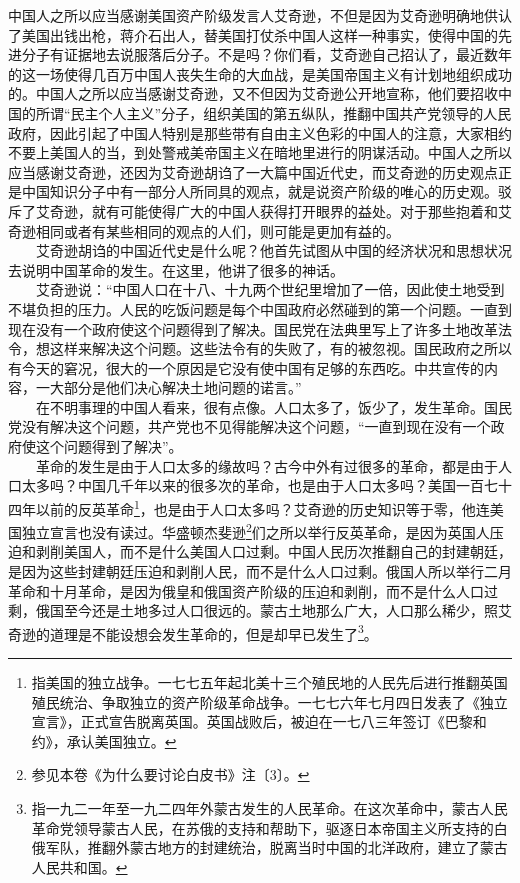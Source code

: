 \documentclass[cn,11pt,chinese]{elegantbook}
\begin{document}
中国人之所以应当感谢美国资产阶级发言人艾奇逊，不但是因为艾奇逊明确地供认了美国出钱出枪，蒋介石出人，替美国打仗杀中国人这样一种事实，使得中国的先进分子有证据地去说服落后分子。不是吗？你们看，艾奇逊自己招认了，最近数年的这一场使得几百万中国人丧失生命的大血战，是美国帝国主义有计划地组织成功的。中国人之所以应当感谢艾奇逊，又不但因为艾奇逊公开地宣称，他们要招收中国的所谓“民主个人主义”分子，组织美国的第五纵队，推翻中国共产党领导的人民政府，因此引起了中国人特别是那些带有自由主义色彩的中国人的注意，大家相约不要上美国人的当，到处警戒美帝国主义在暗地里进行的阴谋活动。中国人之所以应当感谢艾奇逊，还因为艾奇逊胡诌了一大篇中国近代史，而艾奇逊的历史观点正是中国知识分子中有一部分人所同具的观点，就是说资产阶级的唯心的历史观。驳斥了艾奇逊，就有可能使得广大的中国人获得打开眼界的益处。对于那些抱着和艾奇逊相同或者有某些相同的观点的人们，则可能是更加有益的。\\
　　艾奇逊胡诌的中国近代史是什么呢？他首先试图从中国的经济状况和思想状况去说明中国革命的发生。在这里，他讲了很多的神话。\\
　　艾奇逊说：“中国人口在十八、十九两个世纪里增加了一倍，因此使土地受到不堪负担的压力。人民的吃饭问题是每个中国政府必然碰到的第一个问题。一直到现在没有一个政府使这个问题得到了解决。国民党在法典里写上了许多土地改革法令，想这样来解决这个问题。这些法令有的失败了，有的被忽视。国民政府之所以有今天的窘况，很大的一个原因是它没有使中国有足够的东西吃。中共宣传的内容，一大部分是他们决心解决土地问题的诺言。”\\
　　在不明事理的中国人看来，很有点像。人口太多了，饭少了，发生革命。国民党没有解决这个问题，共产党也不见得能解决这个问题，“一直到现在没有一个政府使这个问题得到了解决”。\\
　　革命的发生是由于人口太多的缘故吗？古今中外有过很多的革命，都是由于人口太多吗？中国几千年以来的很多次的革命，也是由于人口太多吗？美国一百七十四年以前的反英革命\footnote[1]{ 指美国的独立战争。一七七五年起北美十三个殖民地的人民先后进行推翻英国殖民统治、争取独立的资产阶级革命战争。一七七六年七月四日发表了《独立宣言》，正式宣告脱离英国。英国战败后，被迫在一七八三年签订《巴黎和约》，承认美国独立。}，也是由于人口太多吗？艾奇逊的历史知识等于零，他连美国独立宣言也没有读过。华盛顿杰斐逊\footnote[2]{ 参见本卷《为什么要讨论白皮书》注〔3〕。}们之所以举行反英革命，是因为英国人压迫和剥削美国人，而不是什么美国人口过剩。中国人民历次推翻自己的封建朝廷，是因为这些封建朝廷压迫和剥削人民，而不是什么人口过剩。俄国人所以举行二月革命和十月革命，是因为俄皇和俄国资产阶级的压迫和剥削，而不是什么人口过剩，俄国至今还是土地多过人口很远的。蒙古土地那么广大，人口那么稀少，照艾奇逊的道理是不能设想会发生革命的，但是却早已发生了\footnote[3]{ 指一九二一年至一九二四年外蒙古发生的人民革命。在这次革命中，蒙古人民革命党领导蒙古人民，在苏俄的支持和帮助下，驱逐日本帝国主义所支持的白俄军队，推翻外蒙古地方的封建统治，脱离当时中国的北洋政府，建立了蒙古人民共和国。}。\\
\end{document}
